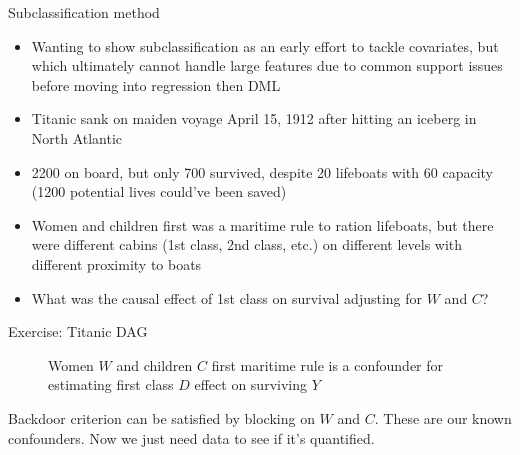 \documentclass{beamer}
\begin{document}
\begin{frame}{Subclassification method}

\begin{itemize}

\item Wanting to show subclassification as an early effort to tackle covariates, but which ultimately cannot handle large features due to common support issues before moving into regression then DML
\item Titanic sank on maiden voyage April 15, 1912 after hitting an iceberg in North Atlantic
\item 2200 on board, but only 700 survived, despite 20 lifeboats with 60 capacity (1200 potential lives could've been saved)
\item Women and children first was a maritime rule to ration lifeboats, but there were different cabins (1st class, 2nd class, etc.) on different levels with different proximity to boats
\item What was the causal effect of 1st class on survival adjusting for $W$ and $C$?
\end{itemize}

\end{frame}


\begin{frame}{Exercise: Titanic DAG}

\begin{figure}
\begin{center}
\caption{Women $W$ and children $C$ first maritime rule is a confounder for estimating first class $D$ effect on surviving $Y$}
\label{fig:titanic}
\end{center}
\end{figure}

\bigskip

Backdoor criterion can be satisfied by blocking on $W$ and $C$.  These are our known confounders.  Now we just need data to see if it's quantified.

\end{frame}
\end{document}
